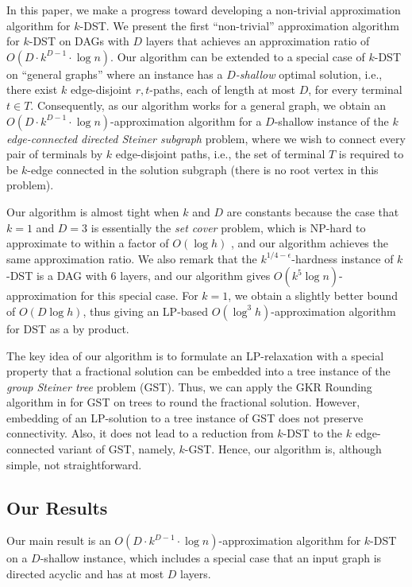 \documentclass[11pt]{article}
\theoremstyle{definition}
\theoremstyle{remark}
\begin{document}
In this paper, we make a progress toward developing a non-trivial
approximation algorithm for $k$-DST.
We present the first ``non-trivial'' approximation algorithm for
$k$-DST on DAGs with $D$ layers that achieves an approximation ratio
of $O(D\cdot k^{D-1}\cdot\log n)$.
Our algorithm can be extended to a special case of $k$-DST 
on ``general graphs'' where an instance has 
a {\em $D$-shallow} optimal solution, i.e., 
there exist $k$ edge-disjoint $r,t$-paths, each of length at most $D$,
for every terminal $t\in T$.
Consequently, as our algorithm works for a general graph,
we obtain an $O(D\cdot k^{D-1}\cdot\log n)$-approximation
algorithm for a $D$-shallow instance of 
the {\em $k$ edge-connected directed Steiner subgraph} problem, where  
we wish to connect every pair of terminals by $k$ edge-disjoint paths,
i.e., the set of terminal $T$ is required to be $k$-edge connected in
the solution subgraph (there is no root vertex in this problem).


Our algorithm is almost tight when $k$ and $D$ are constants
because the case that $k=1$ and $D=3$ is essentially 
the {\em set cover} problem, which is NP-hard to approximate to within
a factor of $O(\log h)$ \cite{LundY94,Feige98},
and our algorithm achieves the same approximation ratio.
We also remark that the $k^{1/4-\epsilon}$-hardness instance of
$k$-DST is a DAG with $6$ layers, and our algorithm gives 
$O(k^5\log n)$-approximation for this special case.
For $k=1$, we obtain a slightly better bound of $O(D\log h)$,
thus giving an LP-based $O(\log^3 h)$-approximation algorithm for DST
as a by product. 

The key idea of our algorithm is to formulate an LP-relaxation
with a special property that a fractional solution
can be embedded into a tree instance of 
the {\em group Steiner tree} problem (GST).
Thus, we can apply the GKR Rounding algorithm in \cite{GargKR00}
for GST on trees to round the fractional solution.
However, embedding of an LP-solution to a tree instance of GST does
not preserve connectivity.
Also, it does not lead to a reduction from $k$-DST to 
the $k$ edge-connected variant of GST, namely, $k$-GST. 
Hence, our algorithm is, although simple, not straightforward. 


\subsection{Our Results}

Our main result is an $O(D \cdot k^{D-1}\cdot \log n)$-approximation
algorithm for $k$-DST on a $D$-shallow instance,
which includes a special case that an input graph 
is directed acyclic and has at most $D$ layers. 
\end{document}
